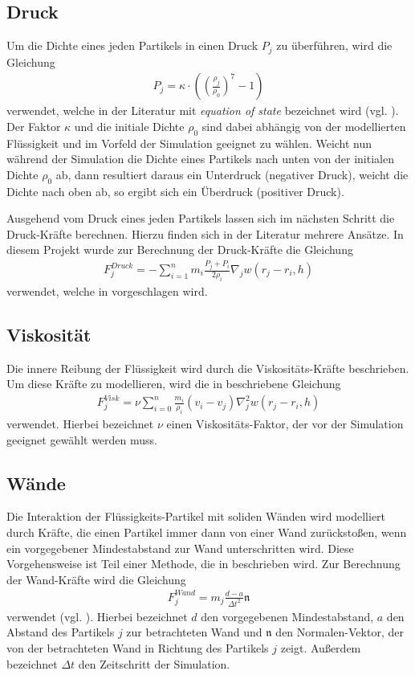 \subsection*{Druck}
Um die Dichte eines jeden Partikels in einen Druck $P_j$ zu überführen, wird die Gleichung
\begin{align}\label{eos}
P_j = \kappa\cdot\left(\left(\frac{\rho_j}{\rho_0}\right)^7 - 1\right)
\end{align}
verwendet, welche in der Literatur mit \emph{equation of state} bezeichnet wird (vgl. \cite[S. 401]{FlowSPH}). Der Faktor $\kappa$ und die initiale Dichte $\rho_0$ sind dabei abhängig von der modellierten Flüssigkeit und im Vorfeld der Simulation geeignet zu wählen. Weicht nun während der Simulation die Dichte eines Partikels nach unten von der initialen Dichte $\rho_0$ ab, dann resultiert daraus ein Unterdruck (negativer Druck), weicht die Dichte nach oben ab, so ergibt sich ein Überdruck (positiver Druck).
\medskip

\noindent Ausgehend vom Druck eines jeden Partikels lassen sich im nächsten Schritt die Druck-Kräfte berechnen. Hierzu finden sich in der Literatur mehrere Ansätze. In diesem Projekt wurde zur Berechnung der Druck-Kräfte die Gleichung
\begin{align}\label{pressure}
F_j^{Druck} = -\sum_{i=1}^n m_i \frac{P_j + P_i}{2\rho_i} \nabla_j w(r_j - r_i, h)
\end{align}
verwendet, welche in \cite[S. 156]{FluidSim} vorgeschlagen wird.

\subsection*{Viskosität}
Die innere Reibung der Flüssigkeit wird durch die Viskositäts-Kräfte beschrieben. Um diese Kräfte zu modellieren, wird die in \cite[S. 156]{FluidSim} beschriebene Gleichung
\begin{align}\label{viscosity}
F_j^{Visk} = \nu \sum_{i=0}^n \frac{m_i}{\rho_i} (v_i - v_j) \nabla_j^2 w(r_j - r_i, h)
\end{align}
verwendet. Hierbei bezeichnet $\nu$ einen Viskositäts-Faktor, der vor der Simulation geeignet gewählt werden muss.

\subsection*{Wände}
Die Interaktion der Flüssigkeits-Partikel mit soliden Wänden wird modelliert durch Kräfte, die einen Partikel immer dann von einer Wand zurückstoßen, wenn ein vorgegebener Mindestabstand zur Wand unterschritten wird. Diese Vorgehensweise ist Teil einer Methode, die in \cite{BoundarySPH} beschrieben wird. Zur Berechnung der Wand-Kräfte wird die Gleichung
\begin{align}\label{boundary}
F_j^{Wand} = m_j\frac{d - a}{{\Delta t}^2} \mathfrak{n}
\end{align}
verwendet (vgl. \cite[Gleichung 26]{BoundarySPH}). Hierbei bezeichnet $d$ den vorgegebenen Mindestabstand, $a$ den Abstand des Partikels $j$ zur betrachteten Wand und $\mathfrak{n}$ den Normalen-Vektor, der von der betrachteten Wand in Richtung des Partikels $j$ zeigt. Außerdem bezeichnet $\Delta t$ den Zeitschritt der Simulation.


